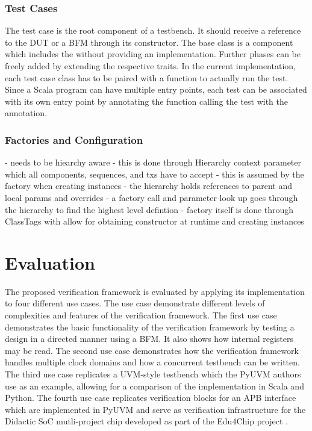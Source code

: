 
\subsection{Test Cases} %

The test case is the root component of a testbench. It should receive a reference to the DUT or a BFM through its
constructor. The  base class is a component which includes the  without providing an
implementation. Further phases can be freely added by extending the respective traits. In the current implementation,
each test case class has to be paired with a  function to actually run the test. Since a Scala program
can have multiple entry points, each test can be associated with its own entry point by annotating the function
calling the test with the  annotation.

\subsection{Factories and Configuration} %


- needs to be hiearchy aware
- this is done through Hierarchy context parameter which all components, sequences, and txs have to accept
- this is assumed by the factory when creating instances
- the hierarchy holds references to parent and local params and overrides
- a factory call and parameter look up goes through the hierarchy to find the highest level defintion
- factory itself is done through ClassTags with allow for obtaining constructor at runtime and creating instances

\chapter{Evaluation}

The proposed verification framework is evaluated by applying its implementation to four different use cases. The use
case demonstrate different levels of complexities and features of the verification framework. The first use case
demonstrates the basic functionality of the verification framework by testing a design in a directed manner using a
BFM. It also shows how internal registers may be read. The second use case demonstrates how the verification
framework handles multiple clock domains and how a concurrent testbench can be written. The third use case replicates
a UVM-style testbench which the PyUVM authors use as an example, allowing for a comparison of the implementation in
Scala and Python. The fourth use case replicates verification blocks for an APB interface which are implemented in
PyUVM and serve as verification infrastructure for the Didactic SoC mutli-project chip developed as part of the
Edu4Chip project \cite{edu4chip}.

